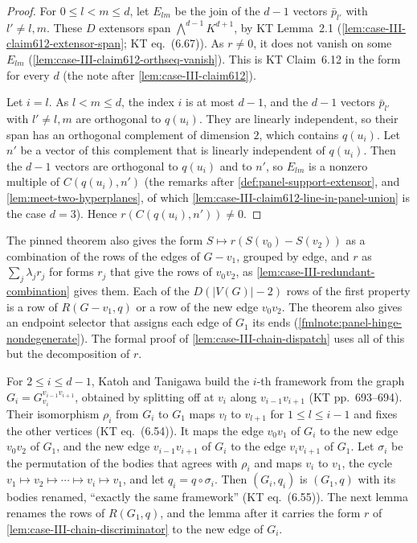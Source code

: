 \begin{proof}
  For $0 \le l < m \le d$, let $E_{lm}$ be the join of the $d - 1$
  vectors $\bar p_{l'}$ with $l' \neq l, m$. These $D$ extensors span
  $\bigwedge^{d-1} K^{d+1}$, by KT Lemma~2.1
  (\cref{lem:case-III-claim612-extensor-span}; KT eq.~(6.67)). As
  $r \neq 0$, it does not vanish on some $E_{lm}$
  (\cref{lem:case-III-claim612-orthseq-vanish}). This is KT Claim~6.12
  in the form for every $d$ (the note after
  \cref{lem:case-III-claim612}).

  Let $i = l$. As $l < m \le d$, the index $i$ is at most $d - 1$, and
  the $d - 1$ vectors $\bar p_{l'}$ with $l' \neq l, m$ are orthogonal to
  $q(u_i)$. They are linearly independent, so their span has an
  orthogonal complement of dimension $2$, which contains $q(u_i)$. Let
  $n'$ be a vector of this complement that is linearly independent of
  $q(u_i)$. Then the $d - 1$ vectors are orthogonal to $q(u_i)$ and to
  $n'$, so $E_{lm}$ is a nonzero multiple of $C(q(u_i), n')$ (the
  remarks after \cref{def:panel-support-extensor}, and
  \cref{lem:meet-two-hyperplanes}, of which
  \cref{lem:case-III-claim612-line-in-panel-union} is the case $d = 3$).
  Hence $r(C(q(u_i), n')) \neq 0$.
\end{proof}
\begin{fmlnote}
  The pinned theorem also gives the form $S \mapsto r(S(v_0) - S(v_2))$
  as a combination of the rows of the edges of $G - v_1$, grouped by
  edge, and $r$ as $\sum_j \lambda_j r_j$ for forms $r_j$ that give the
  rows of $v_0 v_2$, as \cref{lem:case-III-redundant-combination} gives
  them. Each of the $D(|V(G)| - 2)$ rows of the first property is a row
  of $R(G - v_1, q)$ or a row of the new edge $v_0 v_2$. The theorem
  also gives an endpoint selector that assigns each edge of $G_1$ its
  ends (\cref{fmlnote:panel-hinge-nondegenerate}). The formal proof of
  \cref{lem:case-III-chain-dispatch} uses all of this but the
  decomposition of $r$.
\end{fmlnote}

For $2 \le i \le d - 1$, Katoh and Tanigawa build the $i$-th framework
from the graph $G_i = G_{v_i}^{v_{i-1} v_{i+1}}$, obtained by splitting
off at $v_i$ along $v_{i-1} v_{i+1}$ (KT pp.~693--694). Their
isomorphism $\rho_i$ from $G_i$ to $G_1$ maps $v_l$ to $v_{l+1}$ for
$1 \le l \le i - 1$ and fixes the other vertices (KT eq.~(6.54)). It
maps the edge $v_0 v_1$ of $G_i$ to the new edge $v_0 v_2$ of $G_1$, and
the new edge $v_{i-1} v_{i+1}$ of $G_i$ to the edge $v_i v_{i+1}$ of
$G_1$. Let $\sigma_i$ be the permutation of the bodies that agrees with
$\rho_i$ and maps $v_i$ to $v_1$, the cycle
$v_1 \mapsto v_2 \mapsto \cdots \mapsto v_i \mapsto v_1$, and let
$q_i = q \circ \sigma_i$. Then $(G_i, q_i)$ is $(G_1, q)$ with its bodies
renamed, ``exactly the same framework'' (KT eq.~(6.55)). The next lemma
renames the rows of $R(G_1, q)$, and the lemma after it carries the form
$r$ of \cref{lem:case-III-chain-discriminator} to the new edge of $G_i$.

